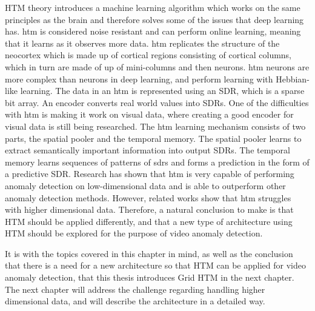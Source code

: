 HTM theory introduces a machine learning algorithm which works on the same principles as the brain and therefore solves some of the issues that deep learning has. \gls*{htm} is considered noise resistant and can perform online learning, meaning that it learns as it observes more data. \gls*{htm} replicates the structure of the neocortex which is made up of cortical regions consisting of cortical columns, which in turn are made of up of mini-columns and then neurons. \gls*{htm} neurons are more complex than neurons in deep learning, and perform learning with Hebbian-like learning. The data in an \gls*{htm} is represented using an SDR, which is a sparse bit array. An encoder converts real world values into SDRs. One of the difficulties with \gls*{htm} is making it work on visual data, where creating a good encoder for visual data is still being researched. The \gls*{htm} learning mechanism consists of two parts, the spatial pooler and the temporal memory. The spatial pooler learns to extract semantically important information into output SDRs. The temporal memory learns sequences of patterns of \glspl*{sdr} and forms a prediction in the form of a predictive SDR. Research has shown that \gls*{htm} is very capable of performing anomaly detection on low-dimensional data and is able to outperform other anomaly detection methods. However, related works show that \gls*{htm} struggles with higher dimensional data. Therefore, a natural conclusion to make is that HTM should be applied differently, and that a new type of architecture using HTM should be explored for the purpose of video anomaly detection.
\par
It is with the topics covered in this chapter in mind, as well as the conclusion that there is a need for a new architecture so that HTM can be applied for video anomaly detection, that this thesis introduces Grid HTM in the next chapter. The next chapter will address the challenge regarding handling higher dimensional data, and will describe the architecture in a detailed way.